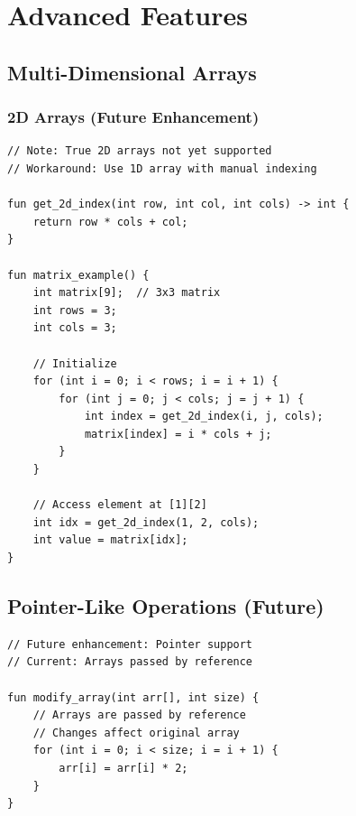 \documentclass[12pt,a4paper,oneside]{book}
\begin{document}
\chapter{Advanced Features}

\section{Multi-Dimensional Arrays}

\subsection{2D Arrays (Future Enhancement)}

\begin{lstlisting}[style=algo]
// Note: True 2D arrays not yet supported
// Workaround: Use 1D array with manual indexing

fun get_2d_index(int row, int col, int cols) -> int {
    return row * cols + col;
}

fun matrix_example() {
    int matrix[9];  // 3x3 matrix
    int rows = 3;
    int cols = 3;
    
    // Initialize
    for (int i = 0; i < rows; i = i + 1) {
        for (int j = 0; j < cols; j = j + 1) {
            int index = get_2d_index(i, j, cols);
            matrix[index] = i * cols + j;
        }
    }
    
    // Access element at [1][2]
    int idx = get_2d_index(1, 2, cols);
    int value = matrix[idx];
}
\end{lstlisting}

\section{Pointer-Like Operations (Future)}

\begin{lstlisting}[style=algo]
// Future enhancement: Pointer support
// Current: Arrays passed by reference

fun modify_array(int arr[], int size) {
    // Arrays are passed by reference
    // Changes affect original array
    for (int i = 0; i < size; i = i + 1) {
        arr[i] = arr[i] * 2;
    }
}
\end{lstlisting}

\end{document}
